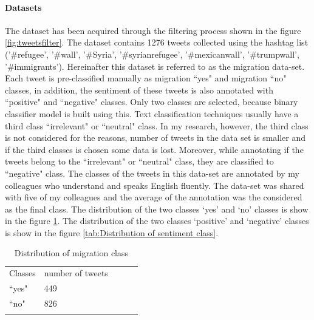 \paragraph{Datasets}
The dataset has been acquired through the filtering process shown in the figure \ref{fig:tweetsfilter}. The dataset contains 1276 tweets collected using the hashtag list (’\#refugee’, ’\#wall’, ’\#Syria’, ’\#syrianrefugee’, ’\#mexicanwall’, ’\#trumpwall’, ’\#immigrants’). Hereinafter this dataset is referred to as the migration data-set. Each tweet is pre-classified manually as migration ``yes" and migration ``no" classes, in addition, the sentiment of these tweets is also annotated with ``positive" and ``negative" classes. Only two classes are selected, because binary classifier model is built using this. Text classification techniques usually have a third class ``irrelevant" or ``neutral" class. In my research, however, the third class is not considered for the reasons, number of tweets in the data set is smaller and if the third classes is chosen some data is lost. Moreover, while annotating if the tweets belong to the ``irrelevant" or ``neutral" class, they are classified to ``negative" class. The classes of the tweets in this data-set are annotated by my colleagues who understand and speaks English fluently. The data-set was shared with five of my colleagues and the average of the annotation was the considered as the final class. The distribution of the two classes `yes' and `no' classes is show in the figure \ref{tab:DistMigrationClass}. The distribution of the two classes `positive' and `negative' classes is show in the figure \ref{tab:Distribution of sentiment class}.



\begin{table}[]
\centering
\begin{tabular}{lllll}
\cline{1-2}
\multicolumn{1}{|l|}{Classes}   & \multicolumn{1}{l|}{number of tweets} &  &  &  \\ \cline{1-2}
\multicolumn{1}{|l|}{``yes"} & \multicolumn{1}{l|}{449}  &  &  &  \\ \cline{1-2}
\multicolumn{1}{|l|}{``no"}   & \multicolumn{1}{l|}{826}  &  &  &  \\ \cline{1-2}
                            &                           &  &  & 

\end{tabular}
\caption{Distribution of migration class}
\label{tab:DistMigrationClass}
\end{table}

